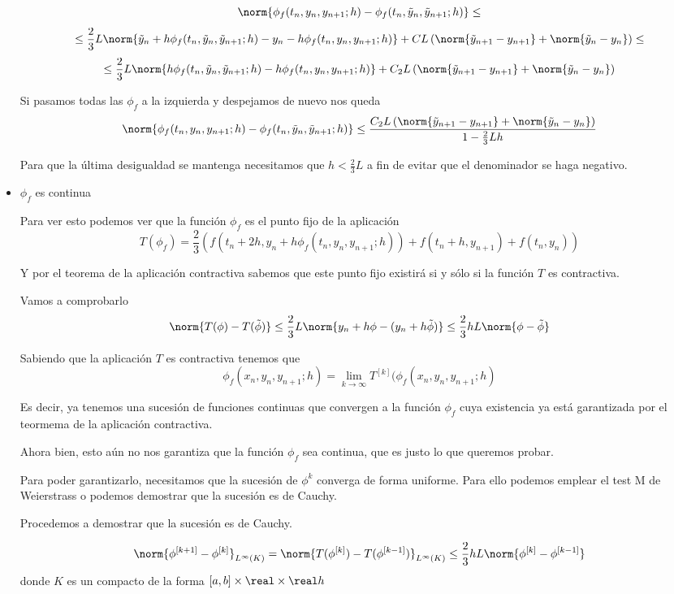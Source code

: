 \begin{problem}[3]
\begin{itemize}
\[\norm{\phi_f(t_n,y_n,y_{n+1};h) - \phi_f(t_n,\tilde{y}_n,\tilde{y}_{n+1};h)} \leq \]
\[\leq\frac{2}{3}L\norm{\tilde{y}_n+h \phi_f(t_n,\tilde{y}_n,\tilde{y}_{n+1};h) - y_n-h \phi_f(t_n,y_n,y_{n+1};h)} + CL\left(\norm{\tilde{y}_{n+1}-y_{n+1}}+\norm{\tilde{y}_n - y_n}\right)\leq\]
\[\leq \frac{2}{3}L\norm{h \phi_f(t_n,\tilde{y}_n,\tilde{y}_{n+1};h)-h \phi_f(t_n,y_n,y_{n+1};h)} + C_2L\left(\norm{\tilde{y}_{n+1}-y_{n+1}}+\norm{\tilde{y}_n - y_n}\right)\]

Si pasamos todas las $\phi_f$ a la izquierda y despejamos de nuevo nos queda
\[\norm{\phi_f(t_n,y_n,y_{n+1};h) - \phi_f(t_n,\tilde{y}_n,\tilde{y}_{n+1};h)} \leq \frac{C_2L\left(\norm{\tilde{y}_{n+1}-y_{n+1}}+\norm{\tilde{y}_n - y_n}\right)}{1-\frac{2}{3}Lh}\]

Para que la última desigualdad se mantenga necesitamos que $h < \frac{2}{3}L$ a fin de evitar que el denominador se haga negativo.

\item $\phi_f$ es continua

Para ver esto podemos ver que la función $\phi_f$ es el punto fijo de la aplicación
\[T(\phi_f) = \frac{2}{3}\left(f(t_n+2h,y_n+h\phi_f(t_n,y_n,y_{n+1};h))+f(t_n+h,y_{n+1})+f(t_n,y_n) \right)\]

Y por el teorema de la aplicación contractiva sabemos que este punto fijo existirá si y sólo si la función $T$ es contractiva.

Vamos a comprobarlo
\[\norm{T(\phi)-T(\tilde{\phi})} \leq \frac{2}{3}L\norm{y_n+h\phi - (y_n+h\tilde{\phi})} \leq \frac{2}{3}hL\norm{\phi-\tilde{\phi}}\]

Sabiendo que la aplicación $T$ es contractiva tenemos que
\[\phi_f(x_n,y_n,y_{n+1};h)=\lim_{k \to \infty} T^{[k]}(\phi_f(x_n,y_n,y_{n+1};h)\]

Es decir, ya tenemos una sucesión de funciones continuas que convergen a la función $\phi_f$ cuya existencia ya está garantizada por el teormema de la aplicación contractiva.

Ahora bien, esto aún no nos garantiza que la función $\phi_f$ sea continua, que es justo lo que queremos probar.

Para poder garantizarlo, necesitamos que la sucesión de $\phi^{k}$ converga de forma uniforme. Para ello podemos emplear el test M de Weierstrass o podemos demostrar que la sucesión es de Cauchy.

Procedemos a demostrar que la sucesión es de Cauchy.

\[\norm{\phi^{[k+1]}-\phi^{[k]}}_{L^{\infty}(K)}=\norm{T(\phi^{[k]}) - T(\phi^{[k-1]})}_{L^{\infty}(K)} \leq \frac{2}{3}hL\norm{\phi^{[k]}-\phi^{[k-1]}} \]
donde $K$ es un compacto de la forma $[a,b] \times \real \times \real h$


\end{itemize}
\end{problem}
